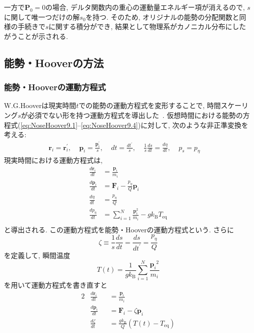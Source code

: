 一方で$\bm{P}_{0} = 0$の場合, デルタ関数内の重心の運動量エネルギー項が消えるので, $s$に関して唯一つだけの解$s_{0}$を持つ. 
そのため, オリジナルの能勢の分配関数と同様の手続きで$s$に関する積分ができ, 結果として物理系がカノニカル分布にしたがうことが示される. 

\subsection{能勢・Hooverの方法}
\subsubsection{能勢・Hooverの運動方程式}
W.G.Hooverは現実時間$t$での能勢の運動方程式を変形することで,
時間スケーリング$s$が必須でない形を持つ運動方程式を導出した~\cite{1985Hoover, 1992Martyna}.
仮想時間における能勢の方程式(\ref{eq:NoseHoover9.1}--\ref{eq:NoseHoover9.4})に対して, 次のような非正準変換を考える:
\begin{align}
 \bm{r}_{i} = \bm{r}^{\prime}_{i},~~~~~
 \bm{p}_{i} = \frac{\bm{p}^{\prime}_{i}}{s},~~~~~
 dt         = \frac{dt^{\prime}}{s},~~~~~
 \frac{1}{s}\frac{ds}{dt} = \frac{d \eta}{dt},~~~~~
 p_{s}      = p_{\eta}~~~~~
\end{align}
現実時間における運動方程式は,
\begin{align}
 \frac{d \bm{r}_{i}}{dt} &= \frac{\bm{p}_{i}}{m_{i}} \\
 \frac{d \bm{p}_{i}}{dt} &= \bm{F}_{i} - \frac{p_{\eta}}{Q} \bm{p}_{i} \\
 \frac{d \eta}{dt}       &= \frac{p_{\eta}}{Q} \\
 \frac{d p_{\eta}}{dt}   &= \sum_{i=1}^{N}\frac{\bm{p}_{i}^{2}}{m_{i}} - g k_{\mathrm{B}} T_{\mathrm{eq}} \\
\end{align}
と導出される. この運動方程式を能勢・Hooverの運動方程式という.
さらに
\begin{equation}
 \zeta \equiv \frac{1}{s} \frac{d s}{d t} = \frac{d s}{d t^{\prime}} = \frac{p_{\eta}}{Q}
 \label{eq:NoseHoover11}
\end{equation}
を定義して, 瞬間温度
\begin{equation}
 T(t) = \frac{1}{g k_{\mathrm{B}}} \sum_{i=1}^{N} \frac{{\bm{p}_{i}}^{2}}{m_{i}}
 \label{eq:NoseHoover12}
\end{equation}
を用いて運動方程式を書き直すと
\begin{alignat}{2}
 &\frac{d \bm{r}_{i}}{d t}
 &&= \frac{\bm{p}_{i}}{m_{i} }
 \label{eq:NoseHoover13.1}
 \\
 &\frac{d \bm{p}_{i}}{d t}
 &&= \bm{F}_{i} - \zeta \bm{p}_{i}
 \label{eq:NoseHoover13.2}
 \\
 &\frac{d \zeta}{d t}
 &&= \frac{g k_{\mathrm{B}}}{Q} \left( T(t) - T_{\mathrm{eq}}\right)
 \label{eq:NoseHoover13.3}
\end{alignat}
